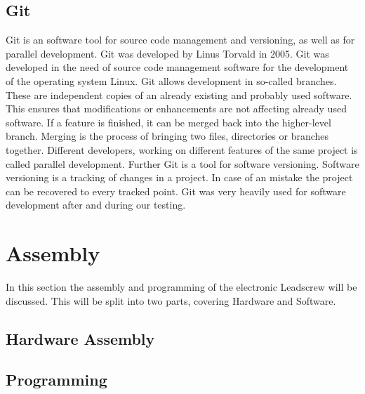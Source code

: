 \subsection{Git}
Git is an software tool for source code management and versioning, as well as for parallel development. 
Git was developed by Linus Torvald in 2005. Git was developed in the need of source code management software for the development of the operating system Linux.
Git allows development in so-called branches. These are independent copies of an already existing and probably used software. 
This ensures that modifications or enhancements are not affecting already used software. If a feature is finished, it can be merged back into the higher-level branch. 
Merging is the process of bringing two files, directories or branches together.
Different developers, working on different features of the same project is called parallel development.
Further Git is a tool for software versioning. Software versioning is a tracking of changes in a project. 
In case of an mistake the project can be recovered to every tracked point.
Git was very heavily used for software development after and during our testing. 

\section{Assembly}
In this section the assembly and programming of the electronic Leadscrew will be discussed. This will be split into two parts, covering Hardware and Software.

\subsection{Hardware Assembly}

\subsection{Programming}